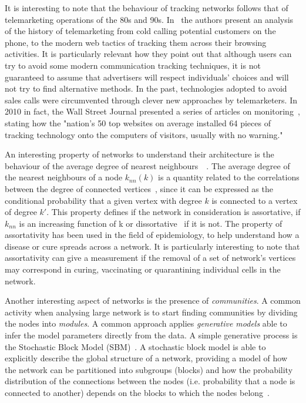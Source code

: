 It is interesting to note that the behaviour of tracking networks follows that of telemarketing operations of the 80s and 90s. In~\cite{hoofnagle2012behavioral} the authors present an analysis of the history of telemarketing from cold calling potential customers on the phone, to the modern web tactics of tracking them across their browsing activities. It is particularly relevant how they point out that although users can try to avoid some modern communication tracking techniques, it is not guaranteed to assume that advertisers will respect individuals' choices and will not try to find alternative methods. In the past, technologies adopted to avoid sales calls were circumvented through clever new approaches by telemarketers. In 2010 in fact, the Wall Street Journal presented a series of articles on monitoring~\cite{angwin2010web}, stating how the "nation's 50 top websites on average installed 64 pieces of tracking technology onto the computers of visitors, usually with no warning."

An interesting property of networks to understand their architecture is the behaviour of the average degree of nearest neighbours~\cite{barrat2004architecture}~\cite{pastor2001dynamical}. The average degree of the nearest neighbours of a node $k_{nn}(k)$ is a quantity related to the correlations between the degree of connected vertices~\cite{maslov2002specificity}, since it can be expressed as the conditional probability that a given vertex with degree $k$ is connected to a vertex of degree $k'$. This property defines if the network in consideration is assortative, if $k_{nn}$ is an increasing function of k or dissortative~\cite{newman2002assortative} if it is not. The property of assortativity has been used in the field of epidemiology, to help understand how a disease or cure spreads across a network. It is particularly interesting to note that assortativity can give a measurement if the removal of a set of network's vertices may correspond in curing, vaccinating or quarantining individual cells in the network. 

Another interesting aspect of networks is the presence of \emph{communities}. A common activity when analysing large network is to start finding communities by dividing the nodes into \emph{modules}. A common approach applies \emph{generative models} able to infer the model parameters directly from the data. A simple generative process is the Stochastic Block Model (SBM)~\cite{holland1983stochastic}. A stochastic block model is able to explicitly describe the global structure of a network, providing a model of how the network can be partitioned into subgroups (blocks) and how the probability distribution of the connections between the nodes (i.e. probability that a node is connected to another) depends on the blocks to which the nodes belong~\cite{faust1992blockmodels}.

